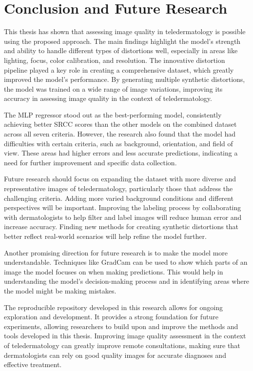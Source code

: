 \chapter{Conclusion and Future Research}
\label{ch:Conclusion}
This thesis has shown that assessing image quality in teledermatology is possible using the proposed approach. The main findings highlight the model’s strength and ability to handle different types of distortions well, especially in areas like lighting, focus, color calibration, and resolution. The innovative distortion pipeline played a key role in creating a comprehensive dataset, which greatly improved the model’s performance. By generating multiple synthetic distortions, the model was trained on a wide range of image variations, improving its accuracy in assessing image quality in the context of teledermatology. \par
\vspace{\baselineskip}
\noindent
The MLP regressor stood out as the best-performing model, consistently achieving better SRCC scores than the other models on the combined dataset across all seven criteria. However, the research also found that the model had difficulties with certain criteria, such as background, orientation, and field of view. These areas had higher errors and less accurate predictions, indicating a need for further improvement and specific data collection. \par
\vspace{\baselineskip}
\noindent
Future research should focus on expanding the dataset with more diverse and representative images of teledermatology, particularly those that address the challenging criteria. Adding more varied background conditions and different perspectives will be important. Improving the labeling process by collaborating with dermatologists to help filter and label images will reduce human error and increase accuracy. Finding new methods for creating synthetic distortions that better reflect real-world scenarios will help refine the model further. \par
\vspace{\baselineskip}
\noindent
Another promising direction for future research is to make the model more understandable. Techniques like GradCam can be used to show which parts of an image the model focuses on when making predictions. This would help in understanding the model’s decision-making process and in identifying areas where the model might be making mistakes. \par
\vspace{\baselineskip}
\noindent
The reproducible repository developed in this research allows for ongoing exploration and development. It provides a strong foundation for future experiments, allowing researchers to build upon and improve the methods and tools developed in this thesis. Improving image quality assessment in the context of teledermatology can greatly improve remote consultations, making sure that dermatologists can rely on good quality images for accurate diagnoses and effective treatment. \par
